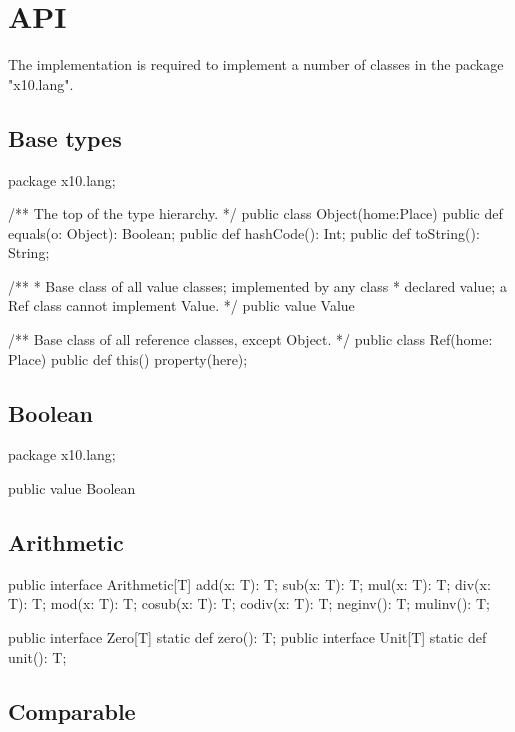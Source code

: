 \chapter{API}\label{XtenAPI}

The \Xten{} implementation is required to implement a number of
classes in the package \xcd"x10.lang".

\section{Base types}

\begin{xten}
package x10.lang;

/** The top of the type hierarchy. */
public class Object(home:Place) {
    public def equals(o: Object): Boolean;
    public def hashCode(): Int;
    public def toString(): String;
}

/**
 * Base class of all value classes; implemented by any class
 * declared value; a Ref class cannot implement Value.
 */
public value Value { }

/** Base class of all reference classes, except Object. */
public class Ref(home: Place) {
    public def this() { property(here); }
}
\end{xten}

\section{Boolean}

\begin{xten}
package x10.lang;

public value Boolean { }
\end{xten}

\section{Arithmetic}

\begin{xten}
public interface Arithmetic[T] {
    add(x: T): T;
    sub(x: T): T;
    mul(x: T): T;
    div(x: T): T;
    mod(x: T): T;
    cosub(x: T): T;
    codiv(x: T): T;
    neginv(): T;
    mulinv(): T;
}

public interface Zero[T] { static def zero(): T; }
public interface Unit[T] { static def unit(): T; }
\end{xten}


\section{Comparable}

